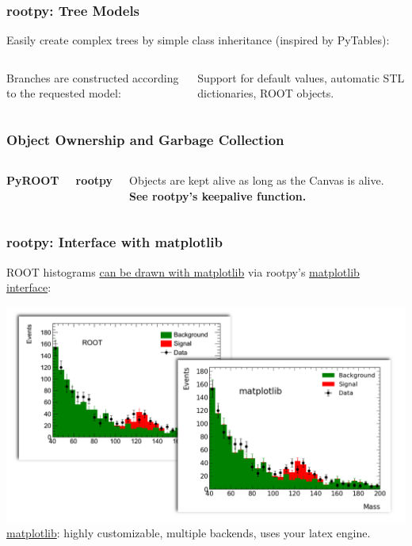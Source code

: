 \documentclass[10pt,professionalfonts,serif,usenames,dvipsnames,svgnames,table]{beamer}
\begin{document}
\begin{frame}[fragile]
    \frametitle{rootpy: Tree Models}
    Easily create complex trees by simple class inheritance (inspired by
    PyTables):
    \vspace{-.6cm}
    \begin{columns}
    

    \vspace{.8cm}

    Branches are constructed according to the requested model:
    
    \vspace{-.3cm}
    Support for default values, automatic STL dictionaries, ROOT objects.
    \end{columns}
\end{frame}

\begin{frame}[fragile]
    \frametitle{Object Ownership and Garbage Collection}
    \begin{columns}
        {\bf PyROOT}
    
        {\bf rootpy}
    
    Objects are kept alive as long as the Canvas is alive. \\
    {\bf See rootpy's keepalive function.}
    \end{columns}
\end{frame}

\begin{frame}
    \frametitle{rootpy: Interface with matplotlib}
    ROOT histograms
    \href{https://github.com/rootpy/rootpy/blob/master/examples/plotting/plot_matplotlib_hist.py}{
    can be drawn with matplotlib} via rootpy's
    \href{https://github.com/rootpy/rootpy/blob/master/rootpy/plotting/root2matplotlib.py}{
    matplotlib interface}:
    \begin{center}
    \includegraphics[width=.9\textwidth]{figs/examples/matplotlib_example.png}\\
    \href{http://matplotlib.org/gallery.html}{matplotlib}: highly customizable,
    multiple backends, uses your latex engine.
\end{center}
\end{frame}
\end{document}
